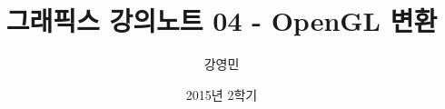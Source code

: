 \documentclass{beamer}
\title[3D 그래픽스 프로그래밍]{그래픽스 강의노트 04 - OpenGL 변환}
\author{강영민}
\institute{동명대학교}
\date{2015년 2학기}
\begin{document}
\begin{frame}
  \titlepage
\end{frame}




%
\end{document}
